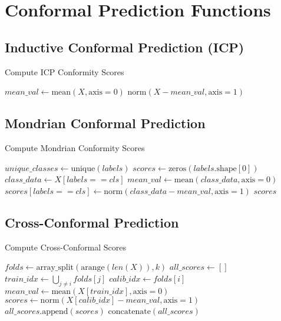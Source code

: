 \documentclass{article}
\begin{document}
\section*{Conformal Prediction Functions}

\subsection*{Inductive Conformal Prediction (ICP)}
\begin{algorithm}
\caption{Compute ICP Conformity Scores}
\begin{algorithmic}[1]
    \State $mean\_val \gets \text{mean}(X, \text{axis}=0)$
    \State \Return $\text{norm}(X - mean\_val, \text{axis}=1)$
\EndFunction
\end{algorithmic}
\end{algorithm}

\subsection*{Mondrian Conformal Prediction}
\begin{algorithm}
\caption{Compute Mondrian Conformity Scores}
\begin{algorithmic}[1]
    \State $unique\_classes \gets \text{unique}(labels)$
    \State $scores \gets \text{zeros}(labels.\text{shape}[0])$
        \State $class\_data \gets X[labels == cls]$
        \State $mean\_val \gets \text{mean}(class\_data, \text{axis}=0)$
        \State $scores[labels == cls] \gets \text{norm}(class\_data - mean\_val, \text{axis}=1)$
    \EndFor
    \State \Return $scores$
\EndFunction
\end{algorithmic}
\end{algorithm}

\subsection*{Cross-Conformal Prediction}
\begin{algorithm}
\caption{Compute Cross-Conformal Scores}
\begin{algorithmic}[1]
    \State $folds \gets \text{array\_split}(\text{arange}(len(X)), k)$
    \State $all\_scores \gets []$
        \State $train\_idx \gets \bigcup_{j \neq i} folds[j]$
        \State $calib\_idx \gets folds[i]$
        \State $mean\_val \gets \text{mean}(X[train\_idx], \text{axis}=0)$
        \State $scores \gets \text{norm}(X[calib\_idx] - mean\_val, \text{axis}=1)$
        \State $all\_scores.\text{append}(scores)$
    \EndFor
    \State \Return $\text{concatenate}(all\_scores)$
\EndFunction
\end{algorithmic}
\end{algorithm}
\end{document}
